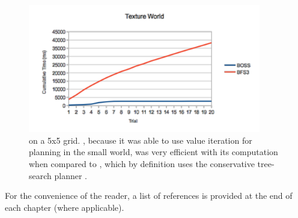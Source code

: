 \begin{figure}
\vskip 0.2in
\begin{center}
\centerline{\includegraphics[width=4in]{figures/tworld-time}}
\caption{
 on a 5x5 grid. , because it was able to use value iteration for planning in the small world, was very efficient with its computation when compared to , which by definition uses the conservative tree-search planner .
}
\label{sec:expr:tworld-time}
\end{center}
\vskip -0.2in
\end{figure} 

%
\ifperchapterbib%
For the convenience of the reader, a list of references is provided at the end of each chapter (where applicable).
\ifendbib%
\else\fi%
\else\fi%
